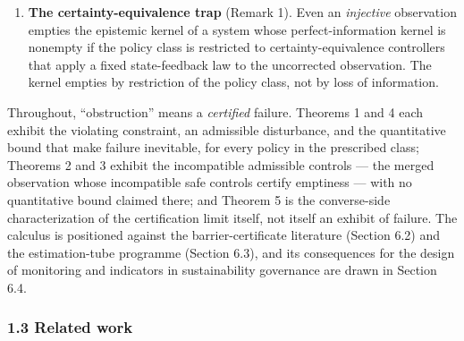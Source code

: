 \documentclass[11pt]{article}
\begin{document}
\begin{enumerate}
  \textbf{The fibre certification criterion} (Theorem 5, Corollary 6).
  An exact observation-only safety certifier --- a function of the
  observation that returns ``safe'' exactly on the safe set --- exists
  if and only if safe-set membership is constant on every observation
  fibre. The certainly-safe set is the sound relaxation: the largest set
  of observations that can be labeled safe without further information.
\item
  \textbf{The certainty-equivalence trap} (Remark 1). Even an
  \emph{injective} observation empties the epistemic kernel of a system
  whose perfect-information kernel is nonempty if the policy class is
  restricted to certainty-equivalence controllers that apply a fixed
  state-feedback law to the uncorrected observation. The kernel empties
  by restriction of the policy class, not by loss of information.
\end{enumerate}

Throughout, ``obstruction'' means a \emph{certified} failure. Theorems 1
and 4 each exhibit the violating constraint, an admissible disturbance,
and the quantitative bound that make failure inevitable, for every policy in the prescribed class; Theorems 2 and 3 exhibit the incompatible
admissible controls --- the merged observation whose incompatible safe
controls certify emptiness --- with no quantitative bound claimed there;
and Theorem 5 is the converse-side characterization of the certification
limit itself, not itself an exhibit of failure. The calculus is positioned against
the barrier-certificate literature (Section 6.2) and the estimation-tube
programme (Section 6.3), and its consequences for the design of
monitoring and indicators in sustainability governance are drawn in
Section 6.4.

\subsubsection{1.3 Related work}\label{related-work}
\end{document}
